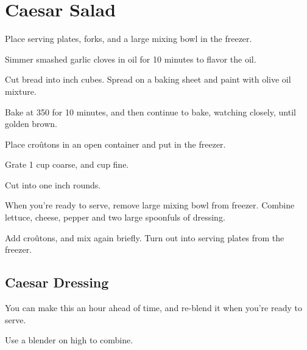 \section{Caesar Salad}
\begin{recipe}


Place serving plates, forks, and a large mixing bowl in the freezer.


Simmer smashed garlic cloves in oil for 10 minutes to flavor the oil.

Cut bread into  inch cubes. Spread on a baking sheet and paint with olive oil mixture.

Bake at 350\degree{} for 10 minutes, and then continue to bake, watching closely, until golden brown.

Place croûtons in an open container and put in the freezer.


Grate 1 cup coarse, and  cup fine.


Cut into one inch rounds.


When you're ready to serve, remove large mixing bowl from freezer. 
Combine lettuce, cheese, pepper and two large spoonfuls of dressing.

Add croûtons, and mix again briefly. Turn out into serving plates from the freezer.

\subsection{Caesar Dressing}

You can make this an hour ahead of time, and re-blend it when you're ready to serve. 


Use a blender on high to combine. 

\end{recipe}
